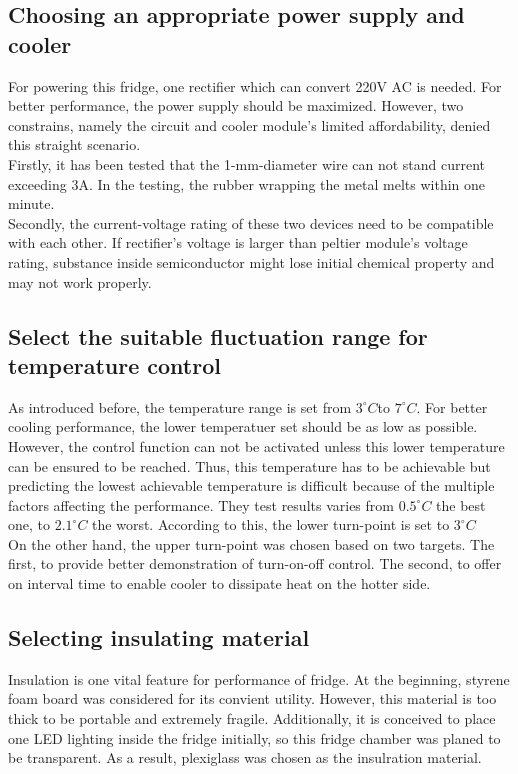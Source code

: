 \documentclass[12pt,onecolumn]{article}
\begin{document}
\subsection{Choosing an appropriate power supply and cooler}
For powering this fridge, one rectifier which can convert 220V AC is needed. For better performance, the power supply should be maximized. However, two constrains, namely the circuit and cooler module's limited affordability, denied this straight scenario. \\
Firstly, it has been tested that the 1-mm-diameter wire can not stand current exceeding 3A. In the testing, the rubber wrapping the metal melts within one minute.\\ 
Secondly, the current-voltage rating of these two devices need to be compatible with each other. If rectifier's voltage is larger than peltier module's voltage rating, substance inside semiconductor might lose initial chemical property and may not work properly. 
\subsection{Select the suitable fluctuation range for temperature control}
As introduced before, the temperature range is set from $3^{\circ}C$to $7^{\circ}C$.  For better cooling performance, the lower temperatuer set should be as low as possible. However, the control function can not be activated unless this lower temperature can be ensured to be reached. Thus, this temperature has to be achievable but predicting the lowest achievable temperature is difficult because of the multiple factors affecting the performance. They test results varies from $0.5^{\circ}C$ the best one, to $2.1^{\circ}C$ the worst. According to this, the lower turn-point is set to $3^{\circ}C$ \\
On the other hand, the upper turn-point was chosen based on two targets. The first, to provide better demonstration of turn-on-off control. The second, to offer on interval time to enable cooler to dissipate heat on the hotter side.
\subsection{Selecting insulating material}
Insulation is one vital feature for performance of fridge. At the beginning, styrene foam board was considered for its convient utility. However, this material is too thick to be portable and extremely fragile. Additionally, it is conceived to place one LED lighting inside the fridge initially, so this fridge chamber was planed to be transparent. As a result, plexiglass was chosen as the insulration material. 
\end{document}
